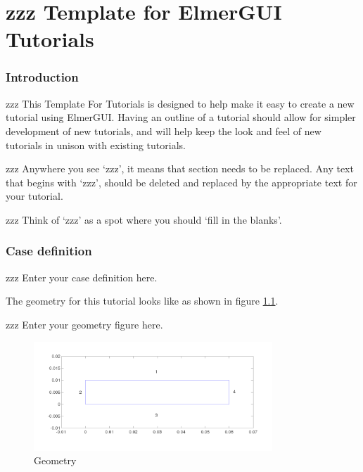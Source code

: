 \chapter{zzz Template for ElmerGUI Tutorials}



\subsection*{Introduction}

zzz This Template For Tutorials is designed to help make it easy to create a new tutorial using ElmerGUI.  Having an outline of a tutorial should allow for simpler development of new tutorials, and will help keep the look and feel of new tutorials in unison with existing tutorials.

zzz Anywhere you see `zzz', it means that section needs to be replaced.  Any text that begins with `zzz', should be deleted and replaced by the appropriate text for your tutorial.  

zzz Think of `zzz' as a spot where you should `fill in the blanks'.



\subsection*{Case definition}


zzz Enter your case definition here.

The geometry for this tutorial looks like as shown in figure \ref{fg:geometry}.

zzz Enter your geometry figure here.

\begin{figure}[H]
\centering
\includegraphics[width=0.8\textwidth]{geometry.png}
\caption{Geometry}\label{fg:geometry}
\end{figure}  

